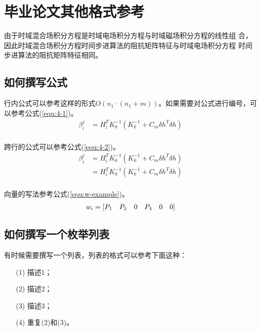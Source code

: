 \documentclass{standalone}
\begin{document}
\chapter{毕业论文其他格式参考}

由于时域混合场积分方程是时域电场积分方程与时域磁场积分方程的线性组
合，因此时域混合场积分方程时间步进算法的阻抗矩阵特征与时域电场积分方程
时间步进算法的阻抗矩阵特征相同。

\section{如何撰写公式}

行内公式可以参考这样的形式$O(n_1 \cdot (n_1 + m))$。如果需要对公式进行编号，可以参考公式(\ref{equ:4-1})。
\begin{equation}
\label{equ:4-1}
\begin{aligned}
\beta_i^{j} &=H_i^T K_{k}^{-1} (K_k^{-1} +C_{m} \delta h^T \delta h) \\
\end{aligned}
\end{equation}

跨行的公式可以参考公式(\ref{equ:4-2})。
\begin{equation}
\label{equ:4-2}
\begin{aligned}
\beta_i^{j} &=H_i^T K_{k}^{-1} (K_k^{-1} +C_{m} \delta h^T \delta h) \\
& =H_i^T K_{k}^{-1} (K_k^{-1} +C_{m} \delta h^T \delta h) \\
\end{aligned}
\end{equation}

向量的写法参考公式(\ref{equ:w-example})。
\begin{equation}
\label{equ:w-example}
\begin{aligned}
\renewcommand{\arraystretch}{0.5}
w_i=\begin{bmatrix}
\setlength{\parskip}{0 pt}
P_1 & P_2 & 0 & P_4 & 0 & 0
\end{bmatrix}
\end{aligned}
\end{equation}

\section{如何撰写一个枚举列表}

有时候需要撰写一个列表，列表的格式可以参考下面这种：
\begin{enumerate}[labelsep = .5em, leftmargin = 0pt, itemindent = 3.8em]
\item[(1)]描述1；
\item[(2)]描述2；
\item[(3)]描述3；
\item[(4)]重复(2)和(3)。
\end{enumerate}
\end{document}
